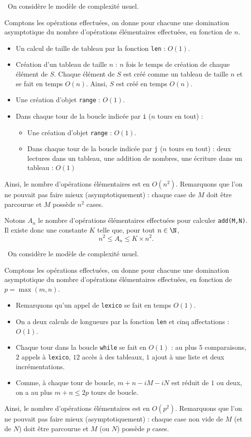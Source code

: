 \question\ 
On considère le modèle de complexité usuel. 

Comptons les opérations effectuées, on donne pour chacune une domination asymptotique du nombre d'opérations élémentaires effectuées, en fonction de $n$. 
\begin{itemize}
  \item Un calcul de taille de tableau par la fonction \texttt{len} : $O(1)$. 
  \item Création d'un tableau de taille $n$ : $n$ fois le temps de création de chaque élément de $S$. Chaque élément de $S$ est créé comme un tableau de taille $n$ et se fait en temps $O(n)$. 
    Ainsi, $S$ est créé en temps $O(n)$. 
  \item Une création d'objet \texttt{range} : $O(1)$. 
  \item Dans chaque tour de la boucle indicée par \texttt{i} ($n$ tours en tout) : 
    \begin{itemize}
      \item Une création d'objet \texttt{range} : $O(1)$. 
      \item Dans chaque tour de la boucle indicée par \texttt{j} ($n$ tours en tout) : deux lectures dans un tableau, une addition de nombres, une écriture dans un tableau : $O(1)$
    \end{itemize}
\end{itemize}
Ainsi, le nombre d'opérations élémentaires est en $O(n^2)$. Remarquons que l'on ne pouvait pas faire mieux (asymptotiquement) : chaque case de $M$ doit être parcourue et $M$ possède $n^2$ cases. 

Notons $A_n$ le nombre d'opérations élémentaires effectuées pour calculer \texttt{add(M,N)}. Il existe donc une constante $K$ telle que, pour tout $n\in\N$, 
\begin{equation*}
  n^2 \leq A_n \leq K\times n^2.
\end{equation*}

\question\ 
On considère le modèle de complexité usuel. 

Comptons les opérations effectuées, on donne pour chacune une domination asymptotique du nombre d'opérations élémentaires effectuées, en fonction de $p = \max(m,n)$.
\begin{itemize}
  \item Remarquons qu'un appel de \texttt{lexico} se fait en temps $O(1)$. 
  \item On a deux calculs de longueurs par la fonction \texttt{len} et cinq affectations : $O(1)$.
  \item Chaque tour dans la boucle \texttt{while} se fait en $O(1)$ : au plus $5$ comparaisons, $2$ appels à \texttt{lexico}, $12$ accès à des tableaux, $1$ ajout à une liste et deux incrémentations. 
  \item Comme, à chaque tour de boucle, $m+n-iM-iN$ est réduit de $1$ ou deux, on a au plus $m+n\leq 2p$ tours de boucle. 
\end{itemize}
Ainsi, le nombre d'opérations élémentaires est en $O(p^2)$. Remarquons que l'on ne pouvait pas faire mieux (asymptotiquement) : chaque case non vide de $M$ (et de $N$) doit être parcourue et $M$ (ou $N$) possède $p$ cases. 

